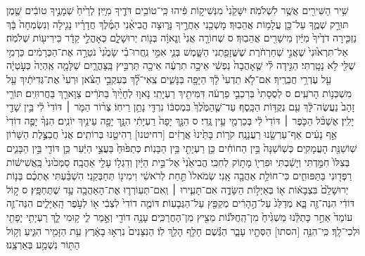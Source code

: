 \documentclass[11pt,twoside]{article}
\begin{document}
{\small{}%
שִׁ֥יר הַשִּׁירִ֖ים אֲשֶׁ֥ר לִשְׁלֹמֹֽה׃
יִשָּׁקֵ֙נִי֙ מִנְּשִׁיק֣וֹת פִּ֔יהוּ כִּֽי־טוֹבִ֥ים דֹּדֶ֖יךָ מִיָּֽיִן׃
לְרֵ֙יחַ֙ שְׁמָנֶ֣יךָ טוֹבִ֔ים שֶׁ֖מֶן תּוּרַ֣ק שְׁמֶ֑ךָ עַל־כֵּ֖ן עֲלָמ֥וֹת אֲהֵבֽוּךָ׃
מָשְׁכֵ֖נִי אַחֲרֶ֣יךָ נָּר֑וּצָה הֱבִיאַ֨נִי הַמֶּ֜לֶךְ חֲדָרָ֗יו נָגִ֤ילָה וְנִשְׂמְחָה֙ בָּ֔ךְ נַזְכִּ֤ירָה דֹדֶ֙יךָ֙ מִיַּ֔יִן מֵישָׁרִ֖ים אֲהֵבֽוּךָ׃ ס
שְׁחוֹרָ֤ה אֲנִי֙ וְֽנָאוָ֔ה בְּנ֖וֹת יְרוּשָׁלָ֑͏ִם כְּאָהֳלֵ֣י קֵדָ֔ר כִּירִיע֖וֹת שְׁלֹמֹֽה׃
אַל־תִּרְא֙וּנִי֙ שֶׁאֲנִ֣י שְׁחַרְחֹ֔רֶת שֶׁשֱּׁזָפַ֖תְנִי הַשָּׁ֑מֶשׁ בְּנֵ֧י אִמִּ֣י נִֽחֲרוּ־בִ֗י שָׂמֻ֙נִי֙ נֹטֵרָ֣ה אֶת־הַכְּרָמִ֔ים כַּרְמִ֥י שֶׁלִּ֖י לֹ֥א נָטָֽרְתִּי׃
הַגִּ֣ידָה לִּ֗י שֶׁ֤אָהֲבָה֙ נַפְשִׁ֔י אֵיכָ֣ה תִרְעֶ֔ה אֵיכָ֖ה תַּרְבִּ֣יץ בַּֽצָּהֳרָ֑יִם שַׁלָּמָ֤ה אֶֽהְיֶה֙ כְּעֹ֣טְיָ֔ה עַ֖ל עֶדְרֵ֥י חֲבֵרֶֽיךָ׃
אִם־לֹ֤א תֵדְעִי֙ לָ֔ךְ הַיָּפָ֖ה בַּנָּשִׁ֑ים צְֽאִי־לָ֞ךְ בְּעִקְבֵ֣י הַצֹּ֗אן וּרְעִי֙ אֶת־גְּדִיֹּתַ֔יִךְ עַ֖ל מִשְׁכְּנ֥וֹת הָרֹעִֽים׃ ס
לְסֻסָתִי֙ בְּרִכְבֵ֣י פַרְעֹ֔ה דִּמִּיתִ֖יךְ רַעְיָתִֽי׃
נָאו֤וּ לְחָיַ֙יִךְ֙ בַּתֹּרִ֔ים צַוָּארֵ֖ךְ בַּחֲרוּזִֽים׃
תּוֹרֵ֤י זָהָב֙ נַעֲשֶׂה־לָּ֔ךְ עִ֖ם נְקֻדּ֥וֹת הַכָּֽסֶף׃
עַד־שֶׁ֤הַמֶּ֙לֶךְ֙ בִּמְסִבּ֔וֹ נִרְדִּ֖י נָתַ֥ן רֵיחֽוֹ׃
צְר֨וֹר הַמֹּ֤ר ׀ דּוֹדִי֙ לִ֔י בֵּ֥ין שָׁדַ֖י יָלִֽין׃
אֶשְׁכֹּ֨ל הַכֹּ֤פֶר ׀ דּוֹדִי֙ לִ֔י בְּכַרְמֵ֖י עֵ֥ין גֶּֽדִי׃ ס
הִנָּ֤ךְ יָפָה֙ רַעְיָתִ֔י הִנָּ֥ךְ יָפָ֖ה עֵינַ֥יִךְ יוֹנִֽים׃
הִנְּךָ֨ יָפֶ֤ה דוֹדִי֙ אַ֣ף נָעִ֔ים אַף־עַרְשֵׂ֖נוּ רַעֲנָנָֽה׃
קֹר֤וֹת בָּתֵּ֙ינוּ֙ אֲרָזִ֔ים [רחיטנו] רַהִיטֵ֖נוּ בְּרוֹתִֽים׃
אֲנִי֙ חֲבַצֶּ֣לֶת הַשָּׁר֔וֹן שֽׁוֹשַׁנַּ֖ת הָעֲמָקִֽים׃
כְּשֽׁוֹשַׁנָּה֙ בֵּ֣ין הַחוֹחִ֔ים כֵּ֥ן רַעְיָתִ֖י בֵּ֥ין הַבָּנֽוֹת׃
כְּתַפּ֙וּחַ֙ בַּעֲצֵ֣י הַיַּ֔עַר כֵּ֥ן דּוֹדִ֖י בֵּ֣ין הַבָּנִ֑ים בְּצִלּוֹ֙ חִמַּ֣דְתִּי וְיָשַׁ֔בְתִּי וּפִרְי֖וֹ מָת֥וֹק לְחִכִּֽי׃
הֱבִיאַ֙נִי֙ אֶל־בֵּ֣ית הַיָּ֔יִן וְדִגְל֥וֹ עָלַ֖י אַהֲבָֽה׃
סַמְּכ֙וּנִי֙ בָּֽאֲשִׁישׁ֔וֹת רַפְּד֖וּנִי בַּתַּפּוּחִ֑ים כִּי־חוֹלַ֥ת אַהֲבָ֖ה אָֽנִי׃
שְׂמֹאלוֹ֙ תַּ֣חַת לְרֹאשִׁ֔י וִימִינ֖וֹ תְּחַבְּקֵֽנִי׃
הִשְׁבַּ֨עְתִּי אֶתְכֶ֜ם בְּנ֤וֹת יְרוּשָׁלִַ֙ם֙ בִּצְבָא֔וֹת א֖וֹ בְּאַיְל֣וֹת הַשָּׂדֶ֑ה אִם־תָּעִ֧ירוּ ׀ וְֽאִם־תְּעֽוֹרְר֛וּ אֶת־הָאַהֲבָ֖ה עַ֥ד שֶׁתֶּחְפָּֽץ׃ ס
ק֣וֹל דּוֹדִ֔י הִנֵּה־זֶ֖ה בָּ֑א מְדַלֵּג֙ עַל־הֶ֣הָרִ֔ים מְקַפֵּ֖ץ עַל־הַגְּבָעֽוֹת׃
דּוֹמֶ֤ה דוֹדִי֙ לִצְבִ֔י א֖וֹ לְעֹ֣פֶר הָֽאַיָּלִ֑ים הִנֵּה־זֶ֤ה עוֹמֵד֙ אַחַ֣ר כָּתְלֵ֔נוּ מַשְׁגִּ֙יחַ֙ מִן־הַֽחֲלֹּנ֔וֹת מֵצִ֖יץ מִן־הֽ͏ַחֲרַכִּֽים׃
עָנָ֥ה דוֹדִ֖י וְאָ֣מַר לִ֑י ק֥וּמִי לָ֛ךְ רַעְיָתִ֥י יָפָתִ֖י וּלְכִי־לָֽךְ׃
כִּֽי־הִנֵּ֥ה [הסתו] הַסְּתָ֖יו עָבָ֑ר הַגֶּ֕שֶׁם חָלַ֖ף הָלַ֥ךְ לֽוֹ׃
הַנִּצָּנִים֙ נִרְא֣וּ בָאָ֔רֶץ עֵ֥ת הַזָּמִ֖יר הִגִּ֑יעַ וְק֥וֹל הַתּ֖וֹר נִשְׁמַ֥ע בְּאַרְצֵֽנוּ׃
}
\end{document}
